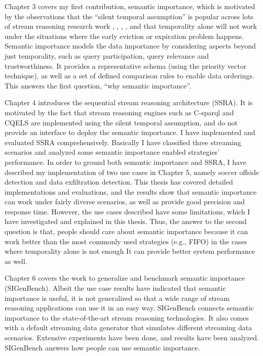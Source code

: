 Chapter 3 covers my first contribution, semantic importance, which is motivated by the observations that the ``silent temporal assumption'' is popular across lots of stream reasoning research work \cite{barbieri2010stream}, \cite{stuckenschmidt2010towards}, \cite{golab2003processing}, \cite{barbieri2010deductive}, and that temporality alone will not work under the situations where the early eviction or expiration problem happens. 
Semantic importance models the data importance by considering aspects beyond just temporality, such as query participation, query relevance and trustworthiness. 
It provides a representative schema (using the priority vector technique), as well as a set of defined comparison rules to enable data orderings. 
This answers the first question, ``why semantic importance''.

Chapter 4 introduces the sequential stream reasoning architecture (SSRA). 
It is motivated by the fact that stream reasoning engines such as C-sparql and CQELS are implemented using the silent temporal assumption, and do not provide an interface to deploy the semantic importance. 
I have implemented and evaluated SSRA comprehensively.
Basically I have classified three streaming scenarios and analyzed some semantic importance enabled strategies' performance. 
In order to ground both semantic importance and SSRA, I have described my implementation of two use cases in Chapter 5, namely soccer offside detection and data exfiltration detection.
This thesis has covered detailed implementations and evaluations, and the results show that semantic importance can work under fairly diverse scenarios, as well as provide good precision and response time. 
However, the use cases described have some limitations, which I have investigated and explained in this thesis. 
Thus, the answer to the second question is that, people should care about semantic importance because it can work better than the most commonly used strategies (e.g., FIFO) in the cases where temporality alone is not enough
It can provide better system performance as well. 

Chapter 6 covers the work to generalize and benchmark semantic importance (SIGenBench).
Albeit the use case results have indicated that semantic importance is useful, it is not generalized so that a wide range of stream reasoning applications can use it in an easy way.
SIGenBench connects semantic importance to the state-of-the-art stream reasoning technologies.
It also comes with a default streaming data generator that simulates different streaming data scenarios. 
Extensive experiments have been done, and results have been analyzed. 
SIGenBench answers how people can use semantic importance.
%
